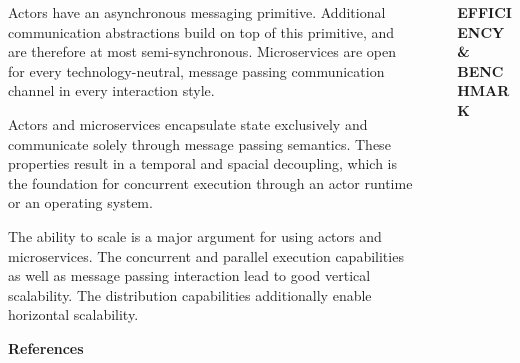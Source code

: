 \documentclass[final,hyperref={pdfpagelabels=true}]{beamer}
\begin{document}
\begin{frame}
\begin{columns}[t]
\begin{column}{.43\textwidth}
{\begin{description}
          \vspace*{1.5\baselineskip}

          \item[\textbf{\textsf{Communication}}] 
          \begin{justify}
          Actors have an asynchronous messaging primitive. Additional communication abstractions build on top of this primitive, and are therefore at most semi-synchronous. Microservices are open for every technology-neutral, message passing communication channel in every interaction style.
          \end{justify}

          \vspace*{1.5\baselineskip}

          \item[\textbf{\textsf{Concurrent Execution}}] 
          \begin{justify}
          Actors and microservices encapsulate state exclusively and communicate solely through message passing semantics. These properties result in a temporal and spacial decoupling, which is the foundation for concurrent execution through an actor runtime or an operating system.
          \end{justify}

          \vspace*{1.5\baselineskip}

          \item[\textbf{\textsf{Scalability}}] 
          \begin{justify}
          The ability to scale is a major argument for using actors and microservices. The concurrent and parallel execution capabilities as well as message passing interaction lead to good vertical scalability. The distribution capabilities additionally enable horizontal scalability.
          \end{justify}
        \end{description}
        
        \vspace*{1\baselineskip}
        {\scriptsize\textbf{\textsf{References}}}
      }
    \end{column}
    \begin{column}{.06\textwidth}
      \end{column}
    \begin{column}{.43\textwidth}
      \textsf{\textbf{EFFICIENCY \& BENCHMARK}} \\
      \vspace*{.5\baselineskip}
      {\lmodern
        \begin{justify}
        

\end{justify}}
\end{column}
\end{columns}
\end{frame}
\end{document}
